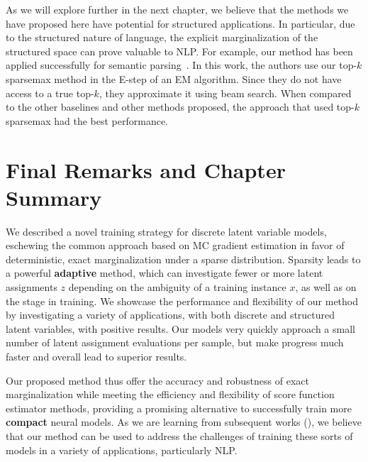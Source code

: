 As we will explore further in the next chapter, we believe that the
methods we have proposed here have potential for structured
applications. In particular, due to the structured nature of
language, the explicit marginalization of the structured space can
prove valuable to NLP. For example, our method has been applied
successfully for semantic
parsing~\citep{wang2021LearningExecutionsSemantic}. In this work, the
authors use our top-$k$ sparsemax method in the E-step of an EM
algorithm. Since they do not have access to a true top-$k$, they
approximate it using beam search. When compared to the other
baselines and other methods proposed, the approach that used top-$k$
sparsemax had the best performance.

\section{Final Remarks and Chapter Summary}

We described a novel training strategy for discrete latent variable
models, eschewing the common approach based on MC gradient estimation
in favor of deterministic, exact marginalization under a sparse
distribution. Sparsity leads to a powerful \textbf{adaptive} method,
which can investigate fewer or more latent assignments $z$ depending
on the ambiguity of a training instance $x$, as well as on the stage
in training. We showcase the performance and flexibility of our
method by investigating a variety of applications, with both discrete
and structured latent variables, with positive results. Our models
very quickly approach a small number of latent assignment evaluations
per sample, but make progress much faster and overall lead to
superior results.

Our proposed method thus offer the accuracy and robustness of exact
marginalization while meeting the efficiency and flexibility of score
function estimator methods, providing a promising alternative to
successfully train more \textbf{compact} neural models. As we are
learning from subsequent works (), we believe
that our method can be used to address the challenges of training
these sorts of models in a variety of applications, particularly NLP.

\cleardoublepage

\singlespacing